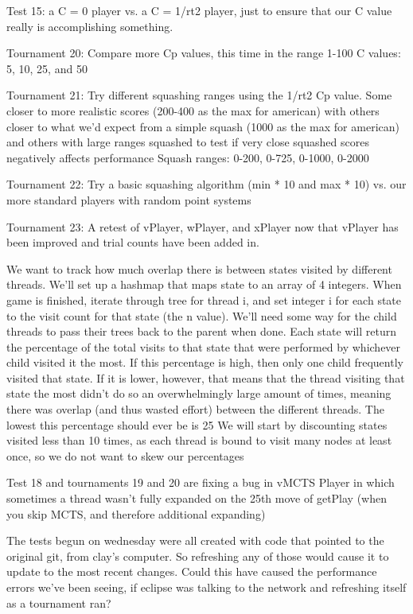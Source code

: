 \documentclass[letterpaper]{article}
\begin{document}
Test 15: a C = 0 player vs. a C = 1/rt2 player, just to ensure that our C value really is accomplishing something.

Tournament 20: Compare more Cp values, this time in the range 1-100
	C values: 5, 10, 25, and 50

Tournament 21: Try different squashing ranges using the 1/rt2 Cp value. Some closer to more realistic scores (200-400 as the max for american) with others closer to what we’d expect from a simple squash (1000 as the max for american) and others with large ranges squashed to test if very close squashed scores negatively affects performance
	Squash ranges: 0-200, 0-725, 0-1000, 0-2000

Tournament 22: Try a basic squashing algorithm (min * 10 and max * 10) vs. our more standard players with random point systems

Tournament 23: A retest of vPlayer, wPlayer, and xPlayer now that vPlayer has been improved and trial counts have been added in. 

We want to track how much overlap there is between states visited by different threads. We’ll set up a hashmap that maps state to an array of 4 integers. When game is finished, iterate through tree for thread i, and set integer i for each state to the visit count for that state (the n value).
We’ll need some way for the child threads to pass their trees back to the parent when done.
Each state will return the percentage of the total visits to that state that were performed by whichever child visited it the most. If this percentage is high, then only one child frequently visited that state. If it is lower, however, that means that the thread visiting that state the most didn’t do so an overwhelmingly large amount of times, meaning there was overlap (and thus wasted effort) between the different threads. The lowest this percentage should ever be is 25%
We will start by discounting states visited less than 10 times, as each thread is bound to visit many nodes at least once, so we do not want to skew our percentages

Test 18 and tournaments 19 and 20 are fixing a bug in vMCTS Player in which sometimes a thread wasn’t fully expanded on the 25th move of getPlay (when you skip MCTS, and therefore additional expanding)

The tests begun on wednesday were all created with code that pointed to the original git, from clay’s computer. So refreshing any of those would cause it to update to the most recent changes. Could this have caused the performance errors we’ve been seeing, if eclipse was talking to the network and refreshing itself as a tournament ran?
\end{document}
